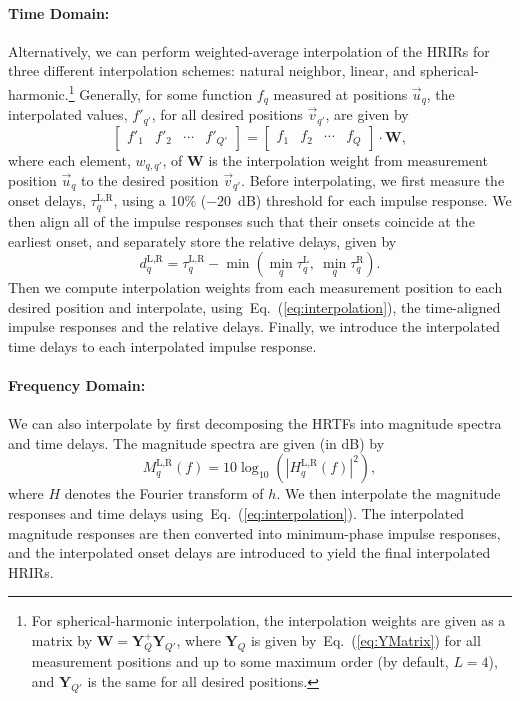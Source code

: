 \documentclass[11pt, oneside]{article}
\newcommand{\eqnref}[1]{Eq.~(\ref{#1})}
\begin{document}
\paragraph{Time Domain:} Alternatively, we can perform weighted-average interpolation of the HRIRs for three different interpolation schemes:
natural neighbor, linear, and spherical-harmonic.\footnote{For spherical-harmonic interpolation, the interpolation weights are given as a matrix by $\mathbf{W} = \mathbf{Y}_Q^+ \mathbf{Y}_{Q'}$, where $\mathbf{Y}_Q$ is given by~\eqnref{eq:YMatrix} for all measurement positions and up to some maximum order (by default, $L = 4$), and $\mathbf{Y}_{Q'}$ is the same for all desired positions.}
Generally, for some function $f_q$ measured at positions $\vec{u}_q$, the interpolated values, $f'_{q'}$, for all desired positions $\vec{v}_{q'}$, are given by
\begin{equation}\label{eq:interpolation}
\begin{bmatrix} f'_1 & f'_2 & \cdots & f'_{Q'} \end{bmatrix} =
\begin{bmatrix} f_1 & f_2 & \cdots & f_{Q} \end{bmatrix} \cdot \mathbf{W},
\end{equation}
where each element, $w_{q,q'}$, of $\mathbf{W}$ is the interpolation weight from measurement position $\vec{u}_q$ to the desired position $\vec{v}_{q'}$.
Before interpolating, we first measure the onset delays, $\tau_q^\text{L,R}$, using a 10\% ($-20$~dB) threshold for each impulse response.
We then align all of the impulse responses such that their onsets coincide at the earliest onset, 
and separately store the relative delays, given by
\begin{equation}
d_q^\text{L,R} = \tau_q^\text{L,R} - \min \left( \min_q \tau_q^\text{L},~ \min_q \tau_q^\text{R} \right).
\end{equation}
Then we compute interpolation weights from each measurement position to each desired position and interpolate,
using~\eqnref{eq:interpolation}, the time-aligned impulse responses and the relative delays.
Finally, we introduce the interpolated time delays to each interpolated impulse response.

\paragraph{Frequency Domain:} We can also interpolate by first decomposing the HRTFs into magnitude spectra and time delays.
The magnitude spectra are given (in dB) by
\begin{equation}
M_q^\text{L,R}(f) = 10 \log_{10} \left( \left| H_q^\text{L,R}(f) \right|^2 \right),
\end{equation}
where $H$ denotes the Fourier transform of $h$.
We then interpolate the magnitude responses and time delays using~\eqnref{eq:interpolation}.
The interpolated magnitude responses are then converted into minimum-phase impulse responses,
and the interpolated onset delays are introduced to yield the final interpolated HRIRs.
\end{document}
